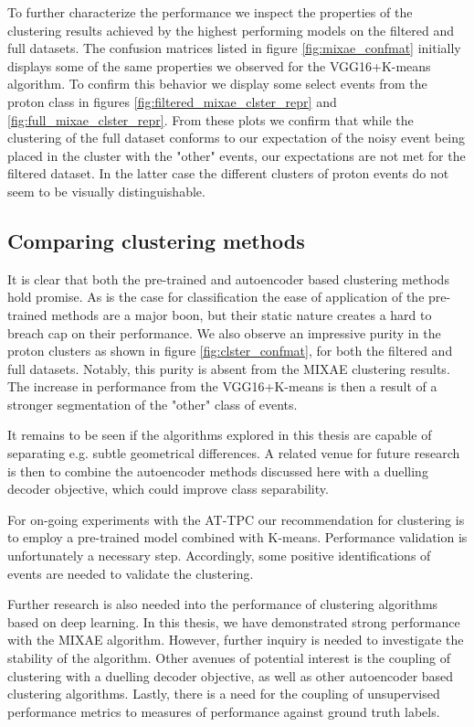 To further characterize the performance we inspect the properties of the clustering results achieved by the highest performing models on the filtered and full datasets. The confusion matrices listed in figure \ref{fig:mixae_confmat} initially displays some of the same properties we observed for the VGG16+K-means algorithm. To confirm this behavior we display some select events from the proton class in figures \ref{fig:filtered_mixae_clster_repr} and \ref{fig:full_mixae_clster_repr}. From these plots we confirm that while the clustering of the full dataset conforms to our expectation of the noisy event being placed in the cluster with the "other" events, our expectations are not met for the filtered dataset. In the latter case the different clusters of proton events do not seem to be visually distinguishable.

\subsection{Comparing clustering methods}

It is clear that both the pre-trained and autoencoder based clustering methods hold promise. As is the case for classification the ease of application of the pre-trained methods are a major boon, but their static nature creates a hard to breach cap on their performance. We also observe an impressive purity in the proton clusters as shown in figure \ref{fig:clster_confmat}, for both the filtered and full datasets. Notably, this purity is absent from the MIXAE clustering results. The increase in performance from the VGG16+K-means is then a result of a stronger segmentation of the "other" class of events.

It remains to be seen if the algorithms explored in this thesis are capable of separating e.g. subtle geometrical differences. A related venue for future research is then to combine the autoencoder methods discussed here with a duelling decoder objective, which could improve class separability.

For on-going experiments with the AT-TPC our recommendation for clustering is to employ a pre-trained model combined with K-means. Performance validation is unfortunately a necessary step. Accordingly, some positive identifications of events are needed to validate the clustering. 

Further research is also needed into the performance of clustering algorithms based on deep learning. In this thesis, we have demonstrated strong performance with the MIXAE algorithm. However, further inquiry is needed to investigate the stability of the algorithm. Other avenues of potential interest is the coupling of clustering with a duelling decoder objective, as well as other autoencoder based clustering algorithms. Lastly, there is a need for the coupling of unsupervised performance metrics to measures of performance against ground truth labels.  
